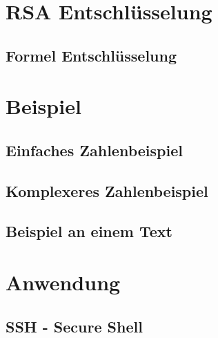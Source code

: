 \section{RSA Entschlüsselung}
\subsection{Formel Entschlüsselung}
\section{Beispiel}
\subsection{Einfaches Zahlenbeispiel}
\subsection{Komplexeres Zahlenbeispiel}
\subsection{Beispiel an einem Text}
\section{Anwendung}
\subsection{SSH - Secure Shell}
